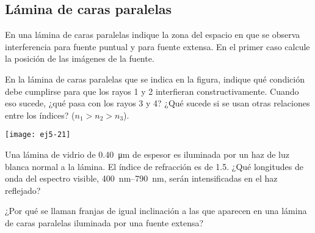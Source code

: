\subsection*{Lámina de caras paralelas}

\item En una lámina de caras paralelas indique la zona del espacio en que se observa interferencia para fuente puntual y para fuente extensa.
En el primer caso calcule la posición de las imágenes de la fuente. 


\item
\begin{minipage}[t][2.2cm]{0.6\textwidth}
En la lámina de caras paralelas que se indica en la figura, indique qué condición debe cumplirse para que los rayos 1 y 2 interfieran constructivamente.
Cuando eso sucede, ¿qué pasa con los rayos 3 y 4?
¿Qué sucede si se usan otras relaciones entre los índices? ($n_{1}>n_{2}>n_{3}$).
\end{minipage}
\begin{minipage}[c][1cm][t]{0.35\textwidth}
	\texttt{[image: ej5-21]}
\end{minipage}


\item Una lámina de vidrio de \SI{0.40}{\micro\metre} de espesor es iluminada por un haz de luz blanca normal a la lámina.
El índice de refracción es de \num{1.5}.
¿Qué longitudes de onda del espectro visible, \SIrange{400}{790}{\nano\metre}, serán intensificadas en el haz reflejado?



\item ¿Por qué se llaman franjas de igual inclinación a las que aparecen en una lámina de caras paralelas iluminada por una fuente extensa? 
